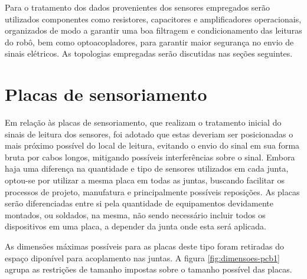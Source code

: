 Para o tratamento dos dados provenientes dos sensores empregados serão 
utilizados componentes como resistores, capacitores e amplificadores 
operacionais, organizados de modo a garantir uma boa filtragem e condicionamento 
das leituras do robô, bem como optoacopladores, para garantir maior segurança no envio
de sinais elétricos.
As topologias empregadas serão discutidas nas seções seguintes.

\section{Placas de sensoriamento}

Em relação às placas de sensoriamento, que realizam o tratamento inicial 
do sinais de leitura dos sensores, foi adotado que estas deveriam 
ser posicionadas o mais próximo possível do local de leitura,
evitando o envio do sinal em sua forma bruta por cabos longos, mitigando
possíveis interferências sobre o sinal. Embora haja uma diferença na quantidade
e tipo de sensores utilizados em cada junta, optou-se por utilizar a mesma
placa em todas as juntas, buscando facilitar os processos de projeto, manufatura
e principalmente possíveis reposições. As placas serão diferenciadas entre si 
pela quantidade de equipamentos devidamente montados, ou soldados, na mesma, não
sendo necessário incluir todos os dispositivos em uma placa, a depender da junta
onde esta será aplicada.

As dimensões máximas possíveis para as placas deste tipo foram retiradas 
do espaço diponível para acoplamento nas juntas. A figura \ref{fig:dimensoes-pcb1} 
agrupa as restrições de tamanho impostas sobre o tamanho possível das placas. 

